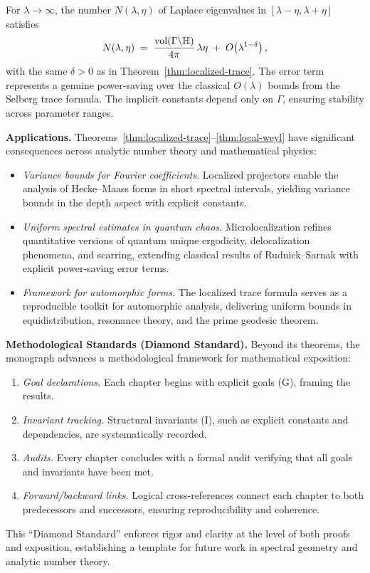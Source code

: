 \begin{theorem}\label{thm:local-weyl}
For $\lambda \to \infty$, the number $N(\lambda,\eta)$ of Laplace eigenvalues
in $[\lambda-\eta,\lambda+\eta]$ satisfies
\[
  N(\lambda,\eta)
  \;=\;
  \frac{\operatorname{vol}(\Gamma \backslash \mathbb{H})}{4\pi}\,\lambda \eta
  \;+\;
  O\!\left(\lambda^{1-\delta}\right),
\]
with the same $\delta>0$ as in Theorem~\ref{thm:localized-trace}. The error
term represents a genuine power-saving over the classical $O(\lambda)$ bounds
from the Selberg trace formula. The implicit constants depend only on $\Gamma$,
ensuring stability across parameter ranges.
\end{theorem}

\medskip
\noindent\textbf{Applications.}
Theorems~\ref{thm:localized-trace}–\ref{thm:local-weyl} have significant
consequences across analytic number theory and mathematical physics:
\begin{itemize}
  \item \emph{Variance bounds for Fourier coefficients.}  
  Localized projectors enable the analysis of Hecke–Maass forms in short
  spectral intervals, yielding variance bounds in the depth aspect with
  explicit constants.
  \item \emph{Uniform spectral estimates in quantum chaos.}  
  Microlocalization refines quantitative versions of quantum unique ergodicity,
  delocalization phenomena, and scarring, extending classical results of
  Rudnick–Sarnak with explicit power-saving error terms.
  \item \emph{Framework for automorphic forms.}  
  The localized trace formula serves as a reproducible toolkit for automorphic
  analysis, delivering uniform bounds in equidistribution, resonance theory,
  and the prime geodesic theorem.
\end{itemize}

\medskip
\noindent\textbf{Methodological Standards (Diamond Standard).}
Beyond its theorems, the monograph advances a methodological framework for
mathematical exposition:
\begin{enumerate}
  \item \emph{Goal declarations.}  
  Each chapter begins with explicit goals (G), framing the results.
  \item \emph{Invariant tracking.}  
  Structural invariants (I), such as explicit constants and dependencies, are
  systematically recorded.
  \item \emph{Audits.}  
  Every chapter concludes with a formal audit verifying that all goals and
  invariants have been met.
  \item \emph{Forward/backward links.}  
  Logical cross-references connect each chapter to both predecessors and
  successors, ensuring reproducibility and coherence.
\end{enumerate}
This ``Diamond Standard'' enforces rigor and clarity at the level of both
proofs and exposition, establishing a template for future work in spectral
geometry and analytic number theory.

